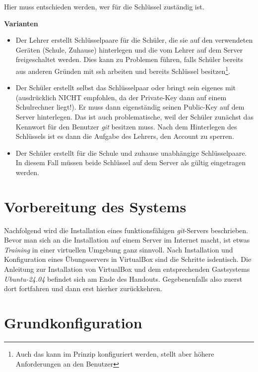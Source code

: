 \documentclass[
  letterpaper,
  DIV=11]{scrreprt}
\newcommand{\git}{\textit{git}\xspace}
\newcommand{\gitservers}{\textit{git}-Servers\xspace}
\begin{document}
Hier muss entschieden werden, wer für die Schlüssel zuständig ist.
\sampleend

\textbf{Varianten}

\begin{itemize}
\item
  Der Lehrer erstellt Schlüsselpaare für die Schüler, die sie auf den
  verwendeten Geräten (Schule, Zuhause) hinterlegen und die vom Lehrer
  auf dem Server freigeschaltet werden. Dies kann zu Problemen führen,
  falls Schüler bereits aus anderen Gründen mit ssh arbeiten und bereits
  Schlüssel besitzen\footnote{Auch das kann im Prinzip konfiguriert
    werden, stellt aber höhere Anforderungen an den Benutzer}.
\item
  Der Schüler erstellt selbst das Schlüsselpaar oder bringt sein eigenes
  mit (ausdrücklich NICHT empfohlen, da der Private-Key dann auf einem
  Schulrechner liegt!). Er muss dann eigenständig seinen Public-Key auf
  dem Server hinterlegen. Das ist auch problematische, weil der Schüler
  zunächst das Kennwort für den Benutzer \git besitzen muss. Nach dem
  Hinterlegen des Schlüssels ist es dann die Aufgabe des Lehrers, den
  Account zu sperren.
\item
  Der Schüler erstellt für die Schule und zuhause unabhängige
  Schlüsselpaare. In diesem Fall müssen beide Schlüssel auf dem Server
  als gültig eingetragen werden.
\end{itemize}

\section{Vorbereitung des Systems}\label{vorbereitung-des-systems}

Nachfolgend wird die Installation eines funktionsfähigen \gitservers
beschrieben. Bevor man sich an die Installation auf einem Server im
Internet macht, ist etwas \emph{Training} in einer virtuellen Umgebung
ganz sinnvoll. Nach Installation und Konfiguration eines Übungsservers
in VirtualBox sind die Schritte isdentisch. Die Anleitung zur
Installation von VirtualBox und dem entsprechenden Gastsystems
\emph{Ubuntu-24.04} befindet sich am Ende des Handouts. Gegebenenfalls
also zuerst dort fortfahren und dann erst hierher zurückkehren.

\section{Grundkonfiguration}\label{grundkonfiguration}
\end{document}
